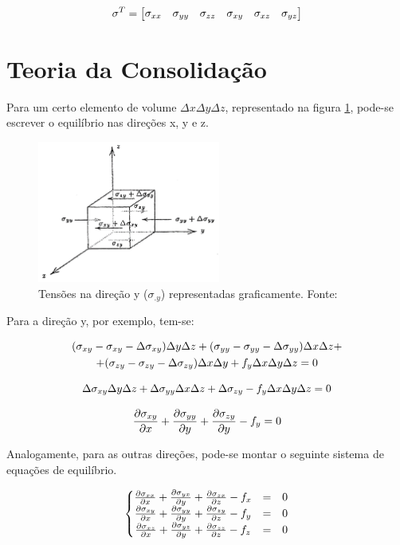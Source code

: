 \begin{equation}
\sigma^T = \begin{bmatrix}
\stxx & \styy & \stzz & \stxy & \stxz & \styz
\end{bmatrix}
\label{eq:tensor6}
\end{equation}


\section{Teoria da Consolidação}

Para um certo elemento de volume $\Delta x\Delta y \Delta z$, representado na figura \ref{fig:equilibrio}, pode-se escrever o equilíbrio nas direções x, y e z.

\begin{figure}[!htbp]
\centering
\includegraphics[width=6cm]{chap01/equilibrio.png}
\caption{Tensões na direção y ($\sigma_{.y}$) representadas graficamente.  Fonte: \cite{CompGeomec}}
\label{fig:equilibrio}
\end{figure}

Para a direção y, por exemplo, tem-se:

\begin{multline}
   (\stxy - \stxy - \Delta \stxy) \Dy\Dz + (\styy - \styy - \Delta \styy)\Dx\Dz  +\\
   + (\stzy - \stzy - \Delta\stzy) \Dx\Dy + f_y\Dx\Dy\Dz = 0
\end{multline}

\begin{equation}
 \Delta \stxy \Dy\Dz + \Delta \styy\Dx\Dz + \Delta\stzy - f_y\Dx\Dy\Dz = 0
\end{equation}

\begin{equation}
\dx[\stxy] + \dy[\styy] + \dy[\stzy] - f_y = 0
\end{equation}

Analogamente, para as outras direções, pode-se montar o seguinte sistema de equações de equilíbrio.

\begin{equation}
\label{eq:equilibrio1}
\left\{\begin{matrix}
 \dx[\stxx] + \dy[\styx] + \dz[\stzx] - f_x & = & 0\\
 \dx[\stxy] + \dy[\styy] + \dz[\stzy] - f_y & = & 0\\
 \dx[\stxz] + \dy[\styz] + \dz[\stzz] - f_z & = & 0
\end{matrix}\right.
\end{equation}

